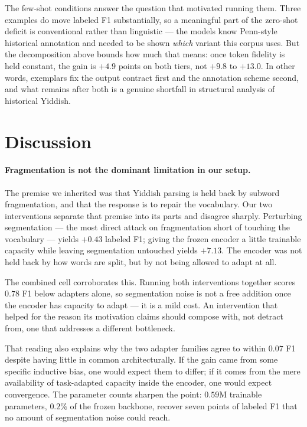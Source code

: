 \documentclass[11pt]{article}
\begin{document}
The few-shot conditions answer the question that motivated running them. Three
examples do move labeled F1 substantially, so a meaningful part of the zero-shot
deficit is conventional rather than linguistic --- the models know Penn-style
historical annotation and needed to be shown \emph{which} variant this corpus
uses. But the decomposition above bounds how much that means: once token fidelity
is held constant, the gain is $+4.9$ points on both tiers, not $+9.8$ to $+13.0$. In
other words, exemplars fix the output contract first and the annotation scheme
second, and what remains after both is a genuine shortfall in structural analysis
of historical Yiddish.

\section{Discussion}

\paragraph{Fragmentation is not the dominant limitation in our setup.} The premise we
inherited was that Yiddish parsing is held back by subword fragmentation, and that
the response is to repair the vocabulary. Our two interventions separate that
premise into its parts and disagree sharply. Perturbing segmentation --- the most
direct attack on fragmentation short of touching the vocabulary --- yields $+0.43$
labeled F1; giving the frozen encoder a little trainable capacity while leaving
segmentation untouched yields $+7.13$. The encoder was not held back by how words
are split, but by not being allowed to adapt at all.

The combined cell corroborates this. Running both interventions together scores
$0.78$ F1 below adapters alone, so segmentation noise is not a free addition once
the encoder has capacity to adapt --- it is a mild cost. An intervention that
helped for the reason its motivation claims should compose with, not detract from,
one that addresses a different bottleneck.

That reading also explains why the two adapter families agree to within $0.07$
F1 despite having little in common architecturally. If the gain came from some
specific inductive bias, one would expect them to differ; if it comes from the
mere availability of task-adapted capacity inside the encoder, one would expect
convergence. The parameter counts sharpen the point: $0.59$M trainable
parameters, $0.2\%$ of the frozen backbone, recover seven points of labeled F1
that no amount of segmentation noise could reach.
\end{document}
